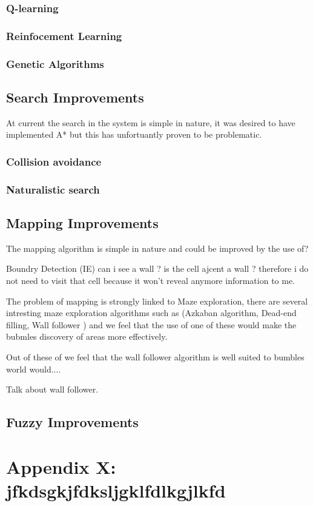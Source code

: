 \documentclass[a4paper,oneside]{report}
\begin{document}
		
		\subsubsection{Q-learning}
		
		\subsubsection{Reinfocement Learning}
		
		\subsubsection{Genetic Algorithms}
	
	\subsection{Search Improvements}
		At current the search in the system is simple in nature, it was desired to have implemented A* but this has unfortuantly proven to be problematic.
		
		\subsubsection{Collision avoidance}
		
		\subsubsection{Naturalistic search}
		
		
	\subsection{Mapping Improvements}
		The mapping algorithm is simple in nature and could be improved by the use of? 
		
		Boundry Detection (IE) can i see a wall ? is the cell ajcent a wall ? therefore i do not need to visit that cell because it won't reveal anymore information to me. 
	
		The problem of mapping is strongly linked to Maze exploration, there are several intresting maze exploration algorithms such as (Azkaban algorithm, Dead-end filling, Wall follower ) and we feel that the use of one of these would make the bubmles discovery of areas more effectively. 
	
		Out of these of  we feel that the wall follower algorithm is well suited to bumbles world would.... 
		
		Talk about wall follower.

	\subsection{Fuzzy Improvements}
		
\appendix
\onehalfspace

\newpage
\section{Appendix X: jfkdsgkjfdksljgklfdlkgjlkfd}
\end{document}
